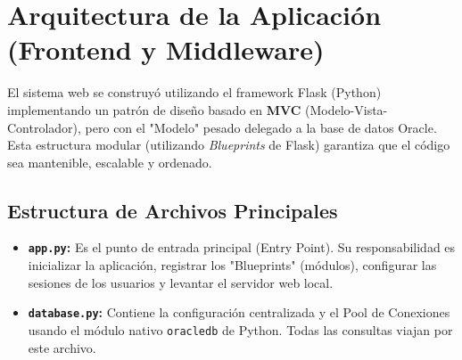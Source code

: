 \documentclass[12pt,a4paper]{article}
\begin{document}

\section{Arquitectura de la Aplicación (Frontend y Middleware)}
El sistema web se construyó utilizando el framework Flask (Python) implementando un patrón de diseño basado en \textbf{MVC} (Modelo-Vista-Controlador), pero con el "Modelo" pesado delegado a la base de datos Oracle. Esta estructura modular (utilizando \textit{Blueprints} de Flask) garantiza que el código sea mantenible, escalable y ordenado.

\subsection{Estructura de Archivos Principales}
\begin{itemize}
    \item \textbf{\texttt{app.py}:} Es el punto de entrada principal (Entry Point). Su responsabilidad es inicializar la aplicación, registrar los "Blueprints" (módulos), configurar las sesiones de los usuarios y levantar el servidor web local.
    \item \textbf{\texttt{database.py}:} Contiene la configuración centralizada y el Pool de Conexiones usando el módulo nativo \texttt{oracledb} de Python. Todas las consultas viajan por este archivo.
\end{itemize}
\end{document}

